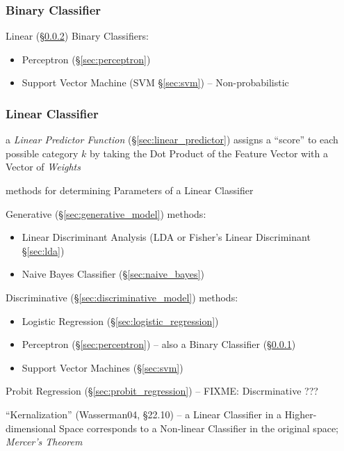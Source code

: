 \subsubsection{Binary Classifier}\label{sec:binary_classifier}

Linear (\S\ref{sec:linear_classifier}) Binary Classifiers:
\begin{itemize}
  \item Perceptron (\S\ref{sec:perceptron})
  \item Support Vector Machine (SVM \S\ref{sec:svm}) -- Non-probabilistic
\end{itemize}



\subsubsection{Linear Classifier}\label{sec:linear_classifier}

a \emph{Linear Predictor Function} (\S\ref{sec:linear_predictor}) assigns a
``score'' to each possible category $k$ by taking the Dot Product of the Feature
Vector with a Vector of \emph{Weights}

methods for determining Parameters of a Linear Classifier

Generative (\S\ref{sec:generative_model}) methods:
\begin{itemize}
  \item Linear Discriminant Analysis (LDA or Fisher's Linear Discriminant
    \S\ref{sec:lda})
  \item Naive Bayes Classifier (\S\ref{sec:naive_bayes})
\end{itemize}

Discriminative (\S\ref{sec:discriminative_model}) methods:
\begin{itemize}
  \item Logistic Regression (\S\ref{sec:logistic_regression})
  \item Perceptron (\S\ref{sec:perceptron}) -- also a Binary Classifier
    (\S\ref{sec:binary_classifier})
  \item Support Vector Machines (\S\ref{sec:svm})
\end{itemize}

Probit Regression (\S\ref{sec:probit_regression}) -- FIXME: Discrminative ???

``Kernalization'' (Wasserman04, \S22.10) -- a Linear Classifier in a
Higher-dimensional Space corresponds to a Non-linear Classifier in the original
space; \emph{Mercer's Theorem}



